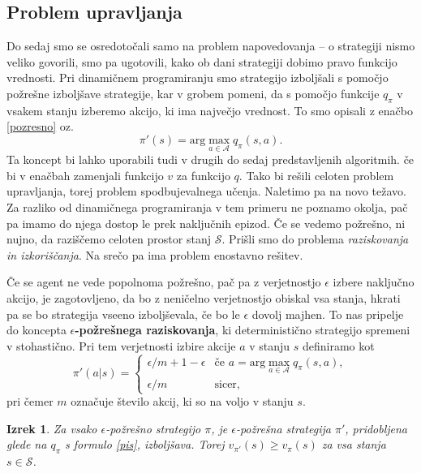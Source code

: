 \documentclass[12pt,a4paper]{amsart}
\theoremstyle{definition} %
\theoremstyle{plain} %
\newtheorem{izrek}[definicija]{Izrek}
\begin{document}
\subsection{Problem upravljanja}
Do sedaj smo se osredotočali samo na problem napovedovanja -- o strategiji nismo veliko govorili, 
smo pa ugotovili, kako ob dani strategiji dobimo pravo funkcijo vrednosti. Pri dinamičnem 
programiranju smo strategijo izboljšali s pomočjo požrešne izboljšave strategije, kar v grobem pomeni, 
da s pomočjo funkcije $q_\pi$ v vsakem stanju izberemo akcijo, ki ima največjo vrednost. To smo opisali 
z enačbo \eqref{pozresno} oz.
$$
\pi'(s) = \text{arg}\max_{a \in \mathcal{A}} q_\pi(s, a).
$$
Ta koncept bi lahko uporabili tudi v drugih do sedaj predstavljenih algoritmih. če bi v enačbah zamenjali 
funkcijo $v$ za funkcijo $q$. Tako bi rešili celoten problem upravljanja, torej problem spodbujevalnega 
učenja. Naletimo pa na novo težavo. Za razliko od dinamičnega programiranja v tem primeru ne poznamo 
okolja, pač pa imamo do njega dostop le prek naključnih epizod. Če se vedemo požrešno, ni nujno, 
da raziščemo celoten prostor stanj $\mathcal{S}$. Prišli smo do problema \textit{raziskovanja in 
izkoriščanja}. Na srečo pa ima problem enostavno rešitev.

Če se agent ne vede popolnoma požrešno, pač pa z verjetnostjo $\epsilon$ izbere naključno akcijo, 
je zagotovljeno, da bo z neničelno verjetnostjo obiskal vsa stanja, hkrati pa se bo strategija 
vseeno izboljševala, če bo le $\epsilon$ dovolj majhen. To nas pripelje do koncepta \textbf{
$\epsilon$-požrešnega raziskovanja}, ki deterministično strategijo spremeni v stohastično. Pri tem 
verjetnosti izbire akcije $a$ v stanju $s$ definiramo kot
\begin{equation}\label{pis}
    \pi'(a|s) = \begin{cases}
                \epsilon / m + 1 - \epsilon & \text{če } a = \text{arg}\max_{a \in 
                    \mathcal{A}} q_\pi(s, a), \\
                    \epsilon / m & \text{sicer},
               \end{cases}
\end{equation}
pri čemer $m$ označuje število akcij, ki so na voljo v stanju $s$.

\begin{izrek}
    Za vsako $\epsilon$-požrešno strategijo $\pi$, je $\epsilon$-požrešna strategija $\pi'$, 
    pridobljena glede na $q_\pi$ s formulo \eqref{pis}, izboljšava. Torej $v_{\pi'}(s) \geq v_\pi(s)$ 
    za vsa stanja $s \in \mathcal{S}$.
\end{izrek}
\end{document}
